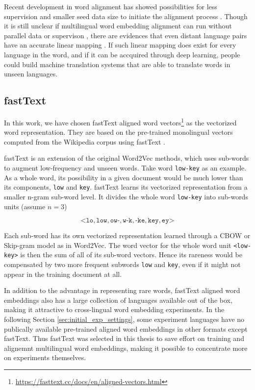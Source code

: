 \documentclass[thesis,fonts=libertine]{cluu}
\begin{document}
Recent development in word alignment has showed possibilities for less supervision and smaller seed data size to initiate the alignment process \parencite{Ruder:2019aa}. Though it is still unclear if multilingual word embedding alignment can run without parallel data or supervison \parencite{Dyer1365879}, there are evidences that even distant language pairs have an accurate linear mapping \parencite{Mikolov:2013ac}. If such linear mapping does exist for every language in the word, and if it can be accquired through deep learning, people could build machine translation systems that are able to translate words in unseen languages.

\subsection{fastText}
\label{sec:fasttext}

In this work, we have chosen fastText aligned word vectors\footnote{\url{https://fasttext.cc/docs/en/aligned-vectors.html}} \parencite{Joulin:2018aa} as the vectorized word representation. They are based on the pre-trained monolingual vectors computed from the Wikipedia corpus using fastText \parencite{Bojanowski:2016aa}.

fastText is an extension of the original Word2Vec methods, which uses sub-words to augment low-frequency and unseen words. Take word \texttt{low-key} as an example. As a whole word, its possibility in a given document would be much lower than its components, \texttt{low} and \texttt{key}. fastText learns its vectorized representation from a smaller n-gram sub-word level. It divides the whole word \texttt{low-key} into sub-words units (assume $n=3$)

\begin{equation*}
  \mathtt{\text{<}lo, low, ow\text{-}, w\text{-}k, \text{-}ke, key, ey\text{>}}
\end{equation*}

\noindent Each sub-word has its own vectorized representation learned through a CBOW or Skip-gram model as in Word2Vec. The word vector for the whole word unit \texttt{<low-key>} is then the sum of all of its sub-word vectors. Hence its rareness would be compensated by two more frequent subwords \texttt{low} and \texttt{key}, even if it might not appear in the training document at all.

In addition to the advantage in representing rare words, fastText aligned word embeddings also has a large collection of languages available out of the box, making it attractive to cross-lingual word embedding experiments. In the following Section \ref{sec:initial_exp_settings}, some experiment languages have no publically available pre-trained aligned word embeddings in other formats except fastText. Thus fastText was selected in this thesis to save effort on training and alignemnt multilingual word embeddings, making it possible to concentrate more on experiments themselves.
\end{document}
